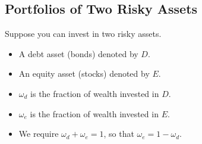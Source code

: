 \documentclass[letterpaper,10pt,english]{sphinxmanual}
\begin{document}
\subsection{Portfolios of Two Risky Assets}
\label{portfolioOpt:portfolios-of-two-risky-assets}
Suppose you can invest in two risky assets.
\begin{itemize}
\item {} 
A debt asset (bonds) denoted by $D$.

\end{itemize}
\begin{itemize}
\item {} 
An equity asset (stocks) denoted by $E$.

\end{itemize}
\begin{itemize}
\item {} 
$\omega_d$ is the fraction of wealth invested in $D$.

\end{itemize}
\begin{itemize}
\item {} 
$\omega_e$ is the fraction of wealth invested in $E$.

\end{itemize}
\begin{itemize}
\item {} 
We require $\omega_d + \omega_e = 1$, so that $\omega_e
= 1 - \omega_d$.

\end{itemize}
\end{document}
